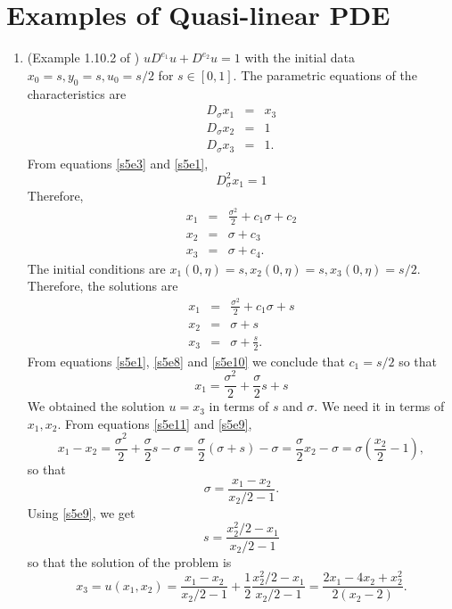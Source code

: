 \documentclass{article}
\theoremstyle{plain}
\numberwithin{thm}{section}
\theoremstyle{plain}
\numberwithin{prop}{section}
\theoremstyle{definition}
\numberwithin{defn}{section}
\theoremstyle{remark}
\numberwithin{equation}{section}
\begin{document}
\section{Examples of Quasi-linear PDE}\label{s5}
\begin{enumerate}
\item (Example 1.10.2 of \cite{ta}) $uD^{e_1}u + D^{e_2}u = 1$ with the initial data $x_0 = s, y_0 = s,
u_0 = s/2$ for $s \in [0, 1]$. The parametric equations of the characteristics are
\begin{eqnarray}
D_\sigma x_1 &=& x_3 \label{s5e1} \\
D_\sigma x_2 &=& 1 \label{s5e2} \\
D_\sigma x_3 &=& 1 \label{s5e3}.
\end{eqnarray}
From equations \eqref{s5e3} and \eqref{s5e1},
\begin{equation}\label{s5e4}
D^2_\sigma x_1 = 1
\end{equation}
Therefore,
\begin{eqnarray}
x_1 &=& \frac{\sigma^2}{2} + c_1\sigma + c_2 \label{s5e5} \\
x_2 &=& \sigma + c_3 \label{s5e6} \\
x_3 &=& \sigma + c_4. \label{s5e7}
\end{eqnarray}
The initial conditions are $x_1(0, \eta) = s, x_2(0, \eta) = s, x_3(0, \eta) = s/2$. Therefore, the
solutions are
\begin{eqnarray}
x_1 &=& \frac{\sigma^2}{2} + c_1\sigma + s \label{s5e8} \\
x_2 &=& \sigma + s \label{s5e9} \\
x_3 &=& \sigma + \frac{s}{2}. \label{s5e10}
\end{eqnarray}
From equations \eqref{s5e1}, \eqref{s5e8} and \eqref{s5e10} we conclude that $c_1 = s/2$ so that
\begin{equation}\label{s5e11}
x_1 = \frac{\sigma^2}{2} + \frac{\sigma}{2}s + s
\end{equation}
We obtained the solution $u = x_3$ in terms of $s$ and $\sigma$. We need it in terms of $x_1, x_2$.
From equations \eqref{s5e11} and \eqref{s5e9},
\[
x_1 - x_2 = \frac{\sigma^2}{2} + \frac{\sigma}{2}s - \sigma = \frac{\sigma}{2}(\sigma + s) - \sigma
= \frac{\sigma}{2}x_2 - \sigma = \sigma\left(\frac{x_2}{2} - 1\right),
\]
so that
\begin{equation}\label{s5e12}
\sigma = \frac{x_1 - x_2}{x_2/2 - 1}.
\end{equation}
Using \eqref{s5e9}, we get
\begin{equation}\label{s5e13}
s = \frac{x_2^2/2 - x_1}{x_2/2 - 1}
\end{equation}
so that the solution of the problem is 
\begin{equation}\label{s5e14}
x_3 = u(x_1, x_2) = \frac{x_1 - x_2}{x_2/2 - 1} + \frac{1}{2}\frac{x_2^2/2 - x_1}{x_2/2 - 1} = 
\frac{2x_1 - 4x_2 + x_2^2}{2(x_2 - 2)}.
\end{equation}


\end{enumerate}
\end{document}
